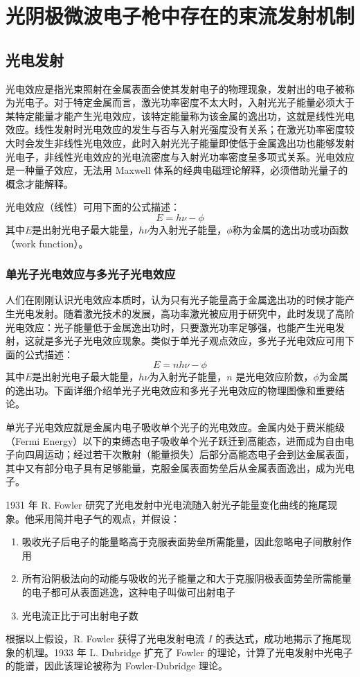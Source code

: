 \section{光阴极微波电子枪中存在的束流发射机制}

\subsection{光电发射}
光电效应是指光束照射在金属表面会使其发射电子的物理现象，发射出的电子被称为光电子。对于特定金属而言，激光功率密度不太大时，入射光光子能量必须大于某特定能量才能产生光电效应，该特定能量称为该金属的逸出功，这就是线性光电效应。线性发射时光电效应的发生与否与入射光强度没有关系；在激光功率密度较大时会发生非线性光电效应，此时入射光光子能量即使低于金属逸出功也能够发射光电子，非线性光电效应的光电流密度与入射光功率密度呈多项式关系。光电效应是一种量子效应，无法用 Maxwell 体系的经典电磁理论解释，必须借助光量子的概念才能解释。

光电效应（线性）可用下面的公式描述：
\[
E = h\nu-\phi
\]
其中$E$是出射光电子最大能量，$h\nu$为入射光子能量，$\phi$称为金属的逸出功或功函数（work function）。

\subsubsection{单光子光电效应与多光子光电效应}
人们在刚刚认识光电效应本质时，认为只有光子能量高于金属逸出功的时候才能产生光电发射。随着激光技术的发展，高功率激光被应用于研究中，此时发现了高阶光电效应：光子能量低于金属逸出功时，只要激光功率足够强，也能产生光电发射，这就是多光子光电效应现象。类似于单光子观点效应，多光子光电效应可用下面的公式描述：
\[
E = nh\nu-\phi
\]
其中$E$是出射光电子最大能量，$h\nu$为入射光子能量，$n$ 是光电效应阶数，$\phi$为金属的逸出功。下面详细介绍单光子光电效应和多光子光电效应的物理图像和重要结论。

单光子光电效应就是金属内电子吸收单个光子的光电效应。金属内处于费米能级（Fermi Energy）以下的束缚态电子吸收单个光子跃迁到高能态，进而成为自由电子向四周运动；经过若干次散射（能量损失）后部分高能态电子会到达金属表面，其中又有部分电子具有足够能量，克服金属表面势垒后从金属表面逸出，成为光电子。

1931 年 R. Fowler 研究了光电发射中光电流随入射光子能量变化曲线的拖尾现象\cite{Fowler:1931aa}。他采用简并电子气的观点，并假设：
	\begin{enumerate}
	\item 吸收光子后电子的能量略高于克服表面势垒所需能量，因此忽略电子间散射作用
	\item 所有沿阴极法向的动能与吸收的光子能量之和大于克服阴极表面势垒所需能量的电子都可从表面逃逸，这种电子叫做可出射电子
	\item 光电流正比于可出射电子数
	\end{enumerate}
	根据以上假设，R. Fowler 获得了光电发射电流 $I$ 的表达式，成功地揭示了拖尾现象的机理。1933 年 L. Dubridge 扩充了 Fowler 的理论，计算了光电发射中光电子的能谱\cite{DuBridge:1933aa}，因此该理论被称为 Fowler-Dubridge 理论。

